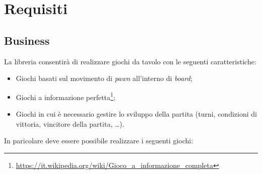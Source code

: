 \section{Requisiti}




\subsection{Business}

La libreria consentirà di realizzare giochi da tavolo con le seguenti caratteristiche:

\begin{itemize}
    \item Giochi basati sul movimento di \textit{pawn} all'interno di \textit{board};
    \item Giochi a informazione perfetta\footnote{\url{https://it.wikipedia.org/wiki/Gioco_a_informazione_completa}};
    \item Giochi in cui è necessario gestire lo sviluppo della partita (turni, condizioni di vittoria, vincitore della partita, \dots).
\end{itemize}

In paricolare deve essere possibile realizzare i seguenti giochi:

